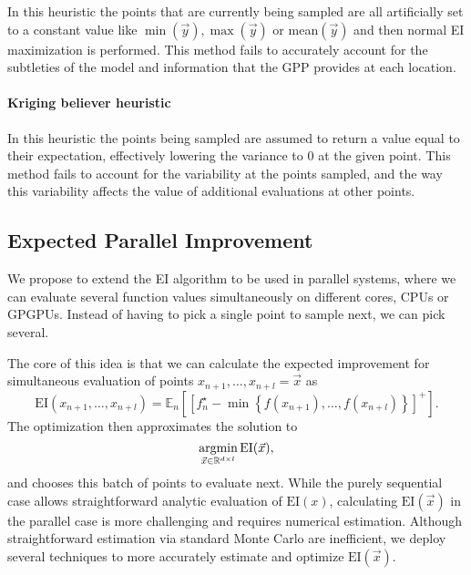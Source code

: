 In this heuristic the points that are currently being sampled are all artificially set to a constant value like $\min(\vec{y}), \max(\vec{y})$ or mean$(\vec{y})$ and then normal EI maximization is performed. This method fails to accurately account for the subtleties of the model and information that the GPP provides at each location.

\paragraph{Kriging believer heuristic}

In this heuristic the points being sampled are assumed to return a value equal to their expectation, effectively lowering the variance to 0 at the given point. This method fails to account for the variability at the points sampled, and the way this variability affects the value of additional evaluations at other points.

\subsection{Expected Parallel Improvement}

We propose to extend the EI algorithm to be used in parallel systems, where we can evaluate several function values simultaneously on different cores, CPUs or GPGPUs. Instead of having to pick a single point to sample next, we can pick several.

The core of this idea is that we can calculate the expected improvement for simultaneous evaluation of points $x_{n+1}, \ldots, x_{n+l} = \vec{x}$ as
\begin{equation}
 \mbox{EI}(x_{n+1}, \ldots, x_{n+l}) = \mathbb{E}_{n}\left[\left[f_{n}^{\star} - \min\left\{f(x_{n+1}), \ldots, f(x_{n+l})\right\}\right]^{+}\right].
\end{equation}
The optimization then approximates the solution to
\begin{equation}
 \operatorname*{argmin}_{\vec{x} \in \mathbb{R}^{d \times l}} \mbox{EI}(\vec{x}),
\end{equation}
and chooses this batch of points to evaluate next. While the purely sequential case allows straightforward analytic evaluation of $\mbox{EI}(x)$, calculating $\mbox{EI}(\vec{x})$ in the parallel case is more challenging and requires numerical estimation. Although straightforward estimation via standard Monte Carlo are inefficient, we deploy several techniques to more accurately estimate and optimize $\mbox{EI}(\vec{x})$.

